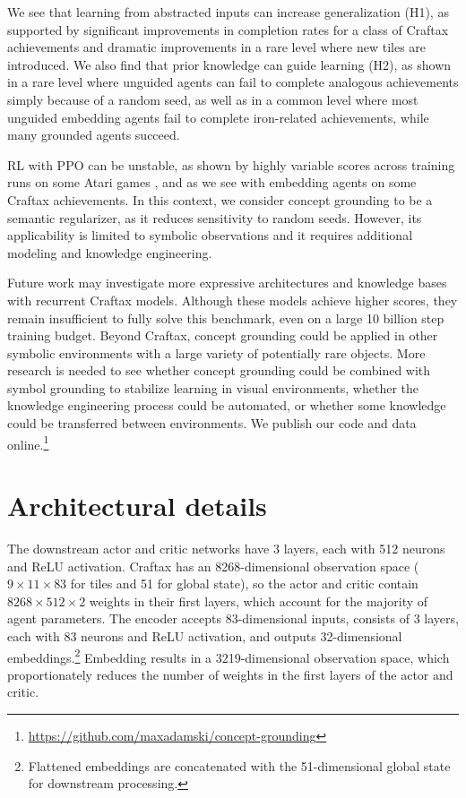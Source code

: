 \documentclass[final]{nesy2026}
\begin{document}
We see that learning from abstracted inputs can increase generalization (H1), as supported by significant improvements in completion rates for a class of Craftax achievements and dramatic improvements in a rare level where new tiles are introduced.
We also find that prior knowledge can guide learning (H2), as shown in a rare level where unguided agents can fail to complete analogous achievements simply because of a random seed, as well as in a common level where most unguided embedding agents fail to complete iron-related achievements, while many grounded agents succeed.

RL with PPO can be unstable, as shown by highly variable scores across training runs on some Atari games \citep{schulman2017}, and as we see with embedding agents on some Craftax achievements.
In this context, we consider concept grounding to be a semantic regularizer, as it reduces sensitivity to random seeds. However, its applicability is limited to symbolic observations and it requires additional modeling and knowledge engineering.

Future work may investigate more expressive architectures and knowledge bases with recurrent Craftax models.
Although these models achieve higher scores, they remain insufficient to fully solve this benchmark, even on a large 10 billion step training budget.
Beyond Craftax, concept grounding could be applied in other symbolic environments with a large variety of potentially rare objects.
More research is needed to see whether concept grounding could be combined with symbol grounding to stabilize learning in visual environments, whether the knowledge engineering process could be automated, or whether some knowledge could be transferred between environments.
We publish our code and data online.\footnote{\url{https://github.com/maxadamski/concept-grounding}}




\appendix

\section{Architectural details}\label{apd:model_details}

The downstream actor and critic networks have 3 layers, each with 512 neurons and ReLU activation.
Craftax has an 8268-dimensional observation space ($9 \times 11 \times 83$ for tiles and 51 for global state), so the actor and critic contain $8268 \times 512 \times 2$ weights in their first layers, which account for the majority of agent parameters.
The encoder accepts 83-dimensional inputs, consists of 3 layers, each with 83 neurons and ReLU activation, and outputs 32-dimensional embeddings.\footnote{Flattened embeddings are concatenated with the 51-dimensional global state for downstream processing.}
Embedding results in a 3219-dimensional observation space, which proportionately reduces the number of weights in the first layers of the actor and critic.
\end{document}
